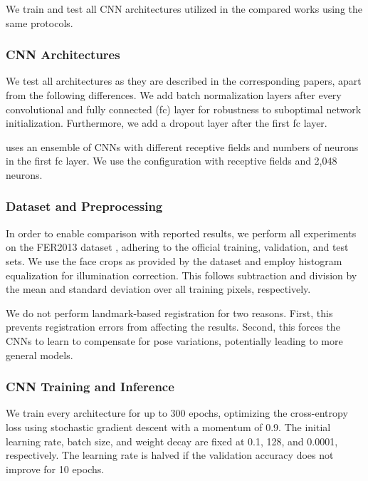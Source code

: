 \documentclass[conference,10pt,a4paper]{IEEEtran}
\begin{document}
We train and test all CNN architectures utilized in the compared works using the same protocols.

\subsubsection{CNN Architectures} \label{ssub:cnn_architectures_exp}

We test all architectures as they are described in the corresponding papers, apart from the following differences. We add batch normalization \cite{ioffe15} layers after every convolutional and fully connected (fc) layer for robustness to suboptimal network initialization. Furthermore, we add a dropout layer \cite{srivastava2014} after the first fc layer.

\cite{kim16} uses an ensemble of CNNs with different receptive fields and numbers of neurons in the first fc layer. We use the configuration with  receptive fields and 2,048 neurons.

\subsubsection{Dataset and Preprocessing} \label{ssub:dataset_and_preprocessing}

In order to enable comparison with reported results, we perform all experiments on the FER2013 dataset \cite{goodfellow15}, adhering to the official training, validation, and test sets. We use the face crops as provided by the dataset and employ histogram equalization for illumination correction. This follows subtraction and division by the mean and standard deviation over all training pixels, respectively.

We do not perform landmark-based registration for two reasons. First, this prevents registration errors from affecting the results. Second, this forces the CNNs to learn to compensate for pose variations, potentially leading to more general models.

\subsubsection{CNN Training and Inference} \label{ssub:cnn_training_and_inference}

We train every architecture for up to 300 epochs, optimizing the cross-entropy loss using stochastic gradient descent with a momentum of 0.9. The initial learning rate, batch size, and weight decay are fixed at 0.1,  128, and 0.0001, respectively. The learning rate is halved if the validation accuracy does not improve for 10 epochs.
\end{document}
